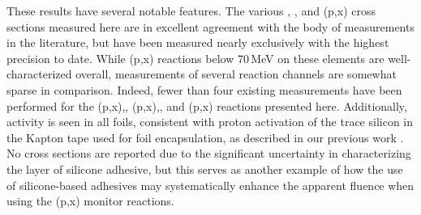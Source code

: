 
% 



These results have several notable features.
The various , , and (p,x) cross sections measured here are in excellent agreement with the body of measurements in the literature,  but have been measured nearly exclusively with the highest precision to date.
While (p,x) reactions below 70\,MeV on these elements are well-characterized overall, measurements of several reaction channels are somewhat sparse in comparison.
Indeed, fewer than four existing measurements have been performed for the (p,x),, (p,x),, and (p,x)
reactions presented here.
Additionally,  activity is seen in all foils, consistent with proton activation of the trace  silicon in the Kapton tape used for foil encapsulation, as described in our previous work \cite{Voyles2018a}.
No cross sections are reported due to the significant uncertainty in characterizing the layer of silicone adhesive, but this serves as another example of how the use of silicone-based adhesives may systematically enhance the apparent fluence when using the (p,x) monitor reactions.


